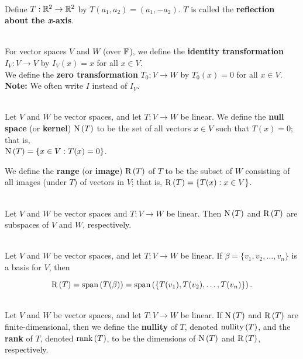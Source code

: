 \begin{definition}
	\hfill\\
	Define $T: \mathbb{R}^2 \to \mathbb{R}^2$ by $T(a_1, a_2) = (a_1, -a_2)$. $T$ is called the \textbf{reflection about the \textit{x}-axis}.
\end{definition}

\begin{definition}
	\hfill\\
	For vector spaces $V$ and $W$ (over $\mathbb{F}$), we define the \textbf{identity transformation} $I_V: V \to V$ by $I_V(x) = x$ for all $x \in V$.\\

	We define the \textbf{zero transformation} $T_0: V \to W$ by $T_0(x) = 0$ for all $x \in V$.\\

	\textbf{Note:} We often write $I$ instead of $I_V$.
\end{definition}

\begin{definition}
	\hfill\\
	Let $V$ and $W$ be vector spaces, and let $T: V \to W$ be linear. We define the \textbf{null space} (or \textbf{kernel}) $\text{N}\left(T\right)$ to be the set of all vectors $x \in V$ such that $T(x)=0$; that is, \\$\text{N}\left(T\right) = \{x \in V : T(x) = 0\}$.

		We define the \textbf{range} (or \textbf{image}) $\text{R}\left(T\right)$ of $T$ to be the subset of $W$ consisting of all images (under $T$) of vectors in $V$; that is, $\text{R}\left(T\right) = \{T(x) : x \in V\}$.
\end{definition}

\begin{theorem}
	\hfill\\
	Let $V$ and $W$ be vector spaces and $T: V \to W$ be linear. Then $\text{N}\left(T\right)$ and $\text{R}\left(T\right)$ are subspaces of $V$ and $W$, respectively.
\end{theorem}

\begin{theorem}
	\hfill\\
	Let $V$ and $W$ be vector spaces, and let $T: V \to W$ be linear. If $\beta = \{v_1, v_2, \dots, v_n\}$ is a basis for $V$, then

	\[\text{R}\left(T\right) = \text{span}\left(T(\beta)\right) = \text{span}\left(\{T(v_1), T(v_2), \dots, T(v_n)\}\right).\]
\end{theorem}

\begin{definition}
	\hfill\\
	Let $V$ and $W$ be vector spaces, and let $T: V \to W$ be linear. If $\text{N}\left(T\right)$ and $\text{R}\left(T\right)$ are finite-dimensional, then we define the \textbf{nullity} of $T$, denoted $\text{nullity}\left(T\right)$, and the \textbf{rank} of $T$, denoted $\text{rank}\left(T\right)$, to be the dimensions of $\text{N}\left(T\right)$ and $\text{R}\left(T\right)$, respectively.
\end{definition}


